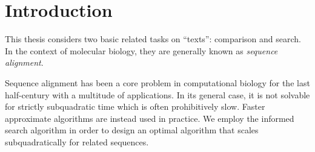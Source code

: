 \graphicspath{{\dir/}}


\chapter*{Introduction} \label{ch:introduction}

This thesis considers two basic related tasks on ``texts'': comparison and
search. In the context of molecular biology, they are generally known as
\emph{sequence alignment}.

Sequence alignment has been a core problem in
computational biology for the last half-century with a multitude of
applications. In its general case, it is not solvable for strictly subquadratic
time which is often prohibitively slow. Faster approximate algorithms are
instead used in practice. We employ  
the \A informed search algorithm in order to design an optimal algorithm that
scales subquadratically for related sequences.





